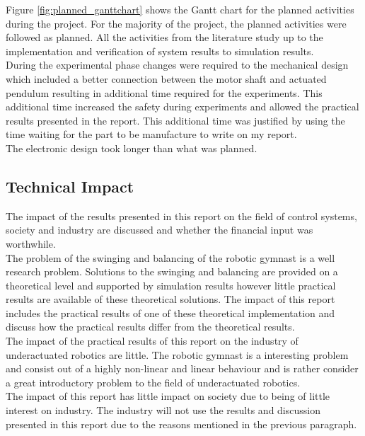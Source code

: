 Figure \ref{fig:planned_ganttchart} shows the Gantt chart for the planned activities during the project. For the majority of the project, the planned activities were followed as planned. All the activities from the literature study up to the implementation and verification of system results to simulation results.\\

During the experimental phase changes were required to the mechanical design which included a better connection between the motor shaft and actuated pendulum resulting in additional time required for the experiments. This additional time increased the safety during experiments and allowed the practical results presented in the report. This additional time was justified by using the time waiting for the part to be manufacture to write on my report.\\	

The electronic design took longer than what was planned.







\subsection{Technical Impact}
The impact of the results presented in this report on the field of control systems, society and industry are discussed and whether the financial input was worthwhile.\\

The problem of the swinging and balancing of the robotic gymnast is a well research problem. Solutions to the swinging and balancing are provided on a theoretical level and supported by simulation results however little practical results are available of these theoretical solutions. The impact of this report includes the practical results of one of these theoretical implementation and discuss how the practical results differ from the theoretical results.\\

The impact of the practical results of this report on the industry of underactuated robotics are little. The robotic gymnast is a interesting problem and consist out of a highly non-linear and linear behaviour and is rather consider a great introductory problem to the field of underactuated robotics.\\

The impact of this report has little impact on society due to being of little interest on industry. The industry will not use the results and discussion presented in this report due to the reasons mentioned in the previous paragraph.\\

